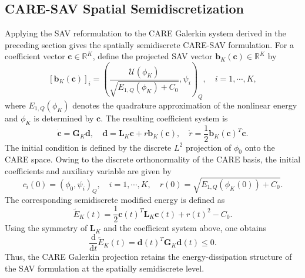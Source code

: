 \documentclass[10pt,reqno]{amsart}
\theoremstyle{remark}
\theoremstyle{definition}
\begin{document}
\subsection{CARE-SAV Spatial Semidiscretization}
Applying the SAV reformulation to the CARE Galerkin system derived in the preceding section gives the spatially semidiscrete CARE-SAV formulation. For a coefficient vector $\boldsymbol{c} \in \mathbb{R}^K$, define the projected SAV vector $\boldsymbol{b}_K(\boldsymbol{c}) \in \mathbb{R}^K$ by
\begin{equation}
  \left[\boldsymbol b_K(\boldsymbol c)\right]_i =\left(\frac{\mathcal U(\phi_K)}{\sqrt{E_{1,Q}(\phi_K)+C_0}},\psi_i\right)_Q,\quad i=1,\cdots, K,
\end{equation}
where $E_{1,Q}(\phi_K)$ denotes the quadrature approximation of the nonlinear energy and $\phi_K$ is determined by $\boldsymbol{c}$. The resulting coefficient system is
\begin{equation}
  \dot{\boldsymbol {c}}=\boldsymbol{G}_K \boldsymbol{d}, \quad
  \boldsymbol{d} = \boldsymbol{L}_K\boldsymbol{c}+r\boldsymbol{b}_K(\boldsymbol{c}), \quad
  \dot{r} =  \frac{1}{2} \boldsymbol{b}_K(\boldsymbol{c})^{T}\dot{\boldsymbol{c}}.
\end{equation}
The initial condition is defined by the discrete $L^2$ projection of $\phi_0$ onto the CARE space. Owing to the discrete orthonormality of the CARE basis, the initial coefficients and auxiliary variable are given by
\begin{equation}
  c_i(0)=(\phi_0,\psi_i)_Q,
  \quad
  i=1,\cdots,K,
  \quad
  r(0) =\sqrt{E_{1,Q}\left(\phi_K(0)\right)+C_0}.
\end{equation}
The corresponding semidiscrete modified energy is defined as
\begin{equation}
\widetilde E_K(t)=\frac{1}{2}
\boldsymbol c(t)^{T}\boldsymbol{L}_K\boldsymbol c(t) +
r(t)^2-C_0.
\end{equation}
Using the symmetry of $\boldsymbol{L}_K$ and the coefficient system above, one obtains
\begin{equation}
  \frac{\mathrm{d}}{\mathrm{d}t}\widetilde E_K(t)= \boldsymbol{d}(t)^{T} \boldsymbol{G}_K\boldsymbol{d}(t) \leq 0.
\end{equation}
Thus, the CARE Galerkin projection retains the energy-dissipation structure of the SAV formulation at the spatially semidiscrete level.
\end{document}
